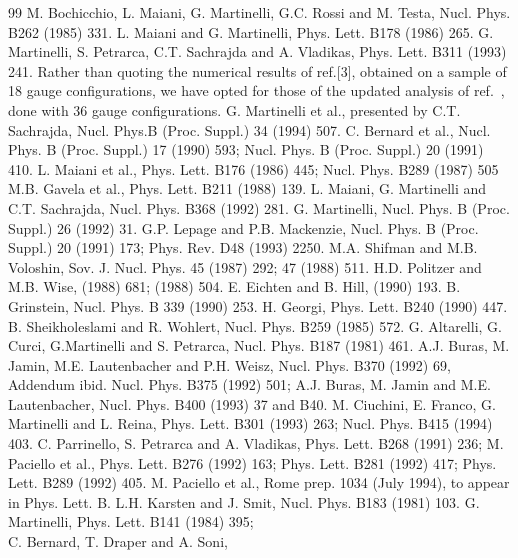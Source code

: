 \begin{thebibliography}{99}
 M. Bochicchio, L. Maiani, G. Martinelli, G.C. Rossi
and M. Testa, Nucl. Phys. B262 (1985) 331.
 L. Maiani and G. Martinelli, Phys. Lett. B178 (1986) 265.
 G. Martinelli, S. Petrarca, C.T. Sachrajda
and A. Vladikas, Phys. Lett. B311 (1993) 241.
Rather than quoting the numerical results of ref.[3], obtained
on a sample of 18 gauge configurations, we have opted for those
of the updated analysis of ref.\ \cite{gribov}, done with 36 gauge
configurations.
 G. Martinelli et al.,
presented by C.T. Sachrajda, Nucl. Phys.B (Proc. Suppl.)
34 (1994) 507.
 C. Bernard et al.,
Nucl. Phys. B (Proc. Suppl.) 17 (1990) 593; Nucl. Phys. B (Proc. Suppl.)
20 (1991) 410.
 L. Maiani et al.,
Phys. Lett. B176 (1986) 445; Nucl. Phys. B289 (1987) 505
 M.B. Gavela et al.,
Phys. Lett. B211 (1988) 139.
 L. Maiani, G. Martinelli and C.T. Sachrajda,
Nucl. Phys. B368 (1992) 281.
 G. Martinelli,
 Nucl. Phys. B (Proc. Suppl.) 26 (1992) 31.
G.P. Lepage and P.B. Mackenzie, Nucl. Phys. B (Proc. Suppl.) 20
(1991) 173; Phys. Rev. D48 (1993) 2250.
 M.A. Shifman and M.B. Voloshin,
Sov. J. Nucl. Phys. 45 (1987) 292; 47 (1988) 511.
 H.D. Politzer and M.B. Wise,
 (1988) 681;  (1988) 504.
 E. Eichten and B. Hill,  (1990) 193.
 B. Grinstein, Nucl. Phys. B 339 (1990) 253.
 H. Georgi, Phys. Lett. B240 (1990) 447.
 B. Sheikholeslami and R. Wohlert, Nucl. Phys.
B259 (1985) 572.
 G. Altarelli, G. Curci, G.Martinelli
and S. Petrarca, Nucl. Phys. B187 (1981) 461.
 A.J. Buras, M. Jamin, M.E. Lautenbacher and P.H. Weisz,
Nucl. Phys.  B370 (1992) 69, Addendum ibid. Nucl. Phys.  B375
(1992) 501;
\noindent
A.J. Buras, M. Jamin and M.E. Lautenbacher, Nucl. Phys.  B400 (1993) 37 and
B40.
 M. Ciuchini, E. Franco, G. Martinelli and L. Reina,
Phys. Lett. B301 (1993) 263; Nucl. Phys.  B415 (1994) 403.
 C. Parrinello, S. Petrarca and
A. Vladikas, Phys. Lett. B268 (1991) 236;
M. Paciello et al.,
Phys. Lett. B276 (1992) 163; Phys. Lett. B281 (1992) 417;
Phys. Lett. B289 (1992) 405.
 M. Paciello et al., Rome prep. 1034 (July 1994),
to appear in Phys. Lett. B.
 L.H. Karsten and J. Smit, Nucl. Phys. B183
(1981) 103.
   G. Martinelli, Phys. Lett. B141 (1984) 395; \\
C. Bernard, T. Draper and A. Soni,

\end{thebibliography}
